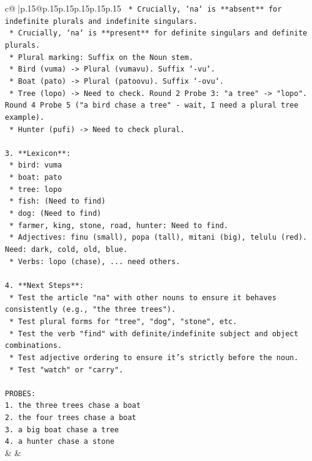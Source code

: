 \documentclass{article}
\begin{document}
{\begin{supertabular}{c@{$\;$}|p{.15\linewidth}@{}p{.15\linewidth}p{.15\linewidth}p{.15\linewidth}p{.15\linewidth}p{.15\linewidth}}
{{{\texttt{    *   Crucially, `na` is **absent** for indefinite plurals and indefinite singulars.} \\
\texttt{    *   Crucially, `na` is **present** for definite singulars and definite plurals.} \\
\texttt{    *   Plural marking: Suffix on the Noun stem.} \\
\texttt{        *   Bird (vuma) {-}> Plural (vumavu). Suffix `{-}vu`.} \\
\texttt{        *   Boat (pato) {-}> Plural (patoovu). Suffix `{-}ovu`.} \\
\texttt{        *   Tree (lopo) {-}> Need to check. Round 2 Probe 3: "a tree" {-}> "lopo". Round 4 Probe 5 ("a bird chase a tree" {-} wait, I need a plural tree example).} \\
\texttt{        *   Hunter (pufi) {-}> Need to check plural.} \\
\\ 
\texttt{3.  **Lexicon**:} \\
\texttt{    *   bird: vuma} \\
\texttt{    *   boat: pato} \\
\texttt{    *   tree: lopo} \\
\texttt{    *   fish: (Need to find)} \\
\texttt{    *   dog: (Need to find)} \\
\texttt{    *   farmer, king, stone, road, hunter: Need to find.} \\
\texttt{    *   Adjectives: finu (small), popa (tall), mitani (big), telulu (red). Need: dark, cold, old, blue.} \\
\texttt{    *   Verbs: lopo (chase), ... need others.} \\
\\ 
\texttt{4.  **Next Steps**:} \\
\texttt{    *   Test the article "na" with other nouns to ensure it behaves consistently (e.g., "the three trees").} \\
\texttt{    *   Test plural forms for "tree", "dog", "stone", etc.} \\
\texttt{    *   Test the verb "find" with definite/indefinite subject and object combinations.} \\
\texttt{    *   Test adjective ordering to ensure it's strictly before the noun.} \\
\texttt{    *   Test "watch" or "carry".} \\
\\ 
\texttt{PROBES:} \\
\texttt{1. the three trees chase a boat} \\
\texttt{2. the four trees chase a boat} \\
\texttt{3. a big boat chase a tree} \\
\texttt{4. a hunter chase a stone} \\
            }
        }
    }
    & & \\ \\


\end{supertabular}}
\end{document}
